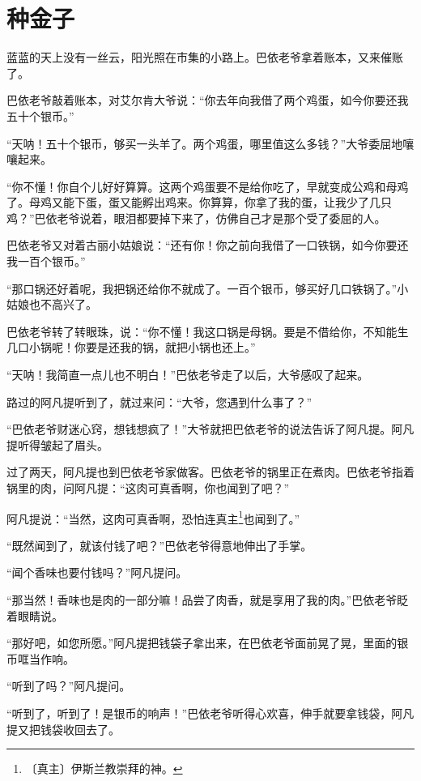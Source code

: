 \documentclass[12pt,UTF-8,openany]{ctexbook}
\begin{document}
\chapter{种金子}

\begin{Large}
    
    蓝蓝的天上没有一丝云，阳光照在市集的小路上。巴依老爷拿着账本，又来催账了。
    
    巴依老爷敲着账本，对艾尔肯大爷说：“你去年向我借了两个鸡蛋，如今你要还我五十个银币。”
    
    “天呐！五十个银币，够买一头羊了。两个鸡蛋，哪里值这么多钱？”大爷委屈地嚷嚷起来。
    
    “你不懂！你自个儿好好算算。这两个鸡蛋要不是给你吃了，早就变成公鸡和母鸡了。母鸡又能下蛋，蛋又能孵出鸡来。你算算，你拿了我的蛋，让我少了几只鸡？”巴依老爷说着，眼泪都要掉下来了，仿佛自己才是那个受了委屈的人。
    
    巴依老爷又对着古丽小姑娘说：“还有你！你之前向我借了一口铁锅，如今你要还我一百个银币。”
    
    “那口锅还好着呢，我把锅还给你不就成了。一百个银币，够买好几口铁锅了。”小姑娘也不高兴了。
    
    巴依老爷转了转眼珠，说：“你不懂！我这口锅是母锅。要是不借给你，不知能生几口小锅呢！你要是还我的锅，就把小锅也还上。”
    
    “天呐！我简直一点儿也不明白！”巴依老爷走了以后，大爷感叹了起来。
    
    路过的阿凡提听到了，就过来问：“大爷，您遇到什么事了？”
    
    “巴依老爷财迷心窍，想钱想疯了！”大爷就把巴依老爷的说法告诉了阿凡提。阿凡提听得皱起了眉头。
    
    过了两天，阿凡提也到巴依老爷家做客。巴依老爷的锅里正在煮肉。巴依老爷指着锅里的肉，问阿凡提：“这肉可真香啊，你也闻到了吧？”
    
    阿凡提说：“当然，这肉可真香啊，恐怕连真主\footnote{〔真主〕伊斯兰教崇拜的神。}也闻到了。”
    
    “既然闻到了，就该付钱了吧？”巴依老爷得意地伸出了手掌。
    
    “闻个香味也要付钱吗？”阿凡提问。
    
    “那当然！香味也是肉的一部分嘛！品尝了肉香，就是享用了我的肉。”巴依老爷眨着眼睛说。
    
    “那好吧，如您所愿。”阿凡提把钱袋子拿出来，在巴依老爷面前晃了晃，里面的银币哐当作响。
    
    “听到了吗？”阿凡提问。
    
    “听到了，听到了！是银币的响声！”巴依老爷听得心欢喜，伸手就要拿钱袋，阿凡提又把钱袋收回去了。
    

\end{Large}
\end{document}
